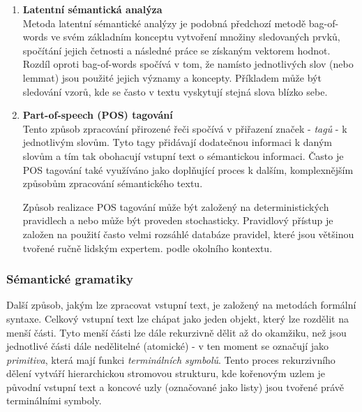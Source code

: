 \begin{enumerate}
	\item \textbf{Latentní sémantická analýza}\\
	      Metoda latentní sémantické analýzy je podobná předchozí metodě bag-of-words ve svém základním konceptu vytvoření množiny
	      sledovaných prvků, spočítání jejich četnosti a následné práce se získaným vektorem hodnot.
	      Rozdíl oproti bag-of-words spočívá v tom, že namísto jednotlivých slov (nebo lemmat) jsou použité jejich významy a koncepty.
	      Příkladem může být sledování vzorů, kde se často v textu vyskytují stejná slova blízko sebe.~\cite{the_conversational_interface}

	\item \textbf{Part-of-speech (POS) tagování}\\
	      Tento způsob zpracování přirozené řeči spočívá v přiřazení značek - \emph{tagů} - k jednotlivým slovům.
	      Tyto tagy přidávají dodatečnou informaci k daným slovům a tím tak obohacují vstupní text o sémantickou informaci.
	      Často je POS tagování také využíváno jako doplňující proces k dalším, komplexnějším způsobům zpracování sémantického textu.~\cite{the_conversational_interface}

	      Způsob realizace POS tagování může být založený na deterministických pravidlech a nebo může být proveden stochasticky.
	      Pravidlový přístup je založen na použití často velmi rozsáhlé databáze pravidel, které jsou většinou tvořené ručně lidským expertem.
	      podle okolního kontextu.~\cite{the_conversational_interface}
\end{enumerate}

\subsubsection{Sémantické gramatiky}\label{subsubsec:grammars}
Další způsob, jakým lze zpracovat vstupní text, je založený na metodách formální syntaxe.
Celkový vstupní text lze chápat jako jeden objekt, který lze rozdělit na menší části.
Tyto menší části lze dále rekurzivně dělit až do okamžiku, než jsou jednotlivé části dále nedělitelné (atomické) - v ten moment se označují jako \emph{primitiva},
která mají funkci \emph{terminálních symbolů}.
Tento proces rekurzivního dělení vytváří hierarchickou stromovou strukturu, kde kořenovým uzlem je původní vstupní text a
koncové uzly (označované jako listy) jsou tvořené právě terminálními symboly.~\cite{PsutkaJ_2006_Mluvimes}

